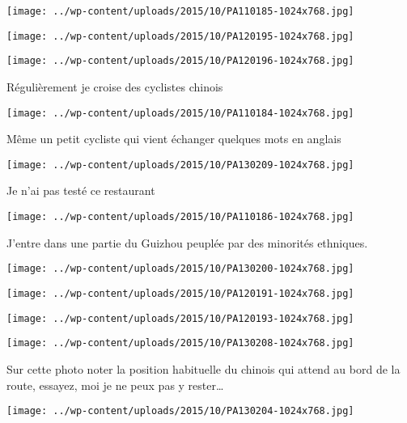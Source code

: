  \newline
\centerline{\texttt{[image: ../wp-content/uploads/2015/10/PA110185-1024x768.jpg]} } 
 \newline
 \newline
\centerline{\texttt{[image: ../wp-content/uploads/2015/10/PA120195-1024x768.jpg]} } 
 \newline
 \newline
\centerline{\texttt{[image: ../wp-content/uploads/2015/10/PA120196-1024x768.jpg]} } 
 \newline
 Régulièrement je croise des cyclistes chinois \newline
 \newline
\centerline{\texttt{[image: ../wp-content/uploads/2015/10/PA110184-1024x768.jpg]} } 
 \newline
 Même un petit cycliste qui vient échanger quelques mots en anglais \newline
 \newline
\centerline{\texttt{[image: ../wp-content/uploads/2015/10/PA130209-1024x768.jpg]} } 
 \newline
 Je n'ai pas testé ce restaurant \newline
 \newline
\centerline{\texttt{[image: ../wp-content/uploads/2015/10/PA110186-1024x768.jpg]} } 
 \newline
 J'entre dans une partie du Guizhou peuplée par des minorités ethniques. \newline
 \newline
\centerline{\texttt{[image: ../wp-content/uploads/2015/10/PA130200-1024x768.jpg]} } 
 \newline
 \newline
\centerline{\texttt{[image: ../wp-content/uploads/2015/10/PA120191-1024x768.jpg]} } 
 \newline
 \newline
\centerline{\texttt{[image: ../wp-content/uploads/2015/10/PA120193-1024x768.jpg]} } 
 \newline
 \newline
\centerline{\texttt{[image: ../wp-content/uploads/2015/10/PA130208-1024x768.jpg]} } 
 \newline
 Sur cette photo noter la position habituelle du chinois qui attend au bord de la route, essayez, moi je ne peux pas y rester… \newline
 \newline
\centerline{\texttt{[image: ../wp-content/uploads/2015/10/PA130204-1024x768.jpg]} } 
 \newline

\newpage
 

